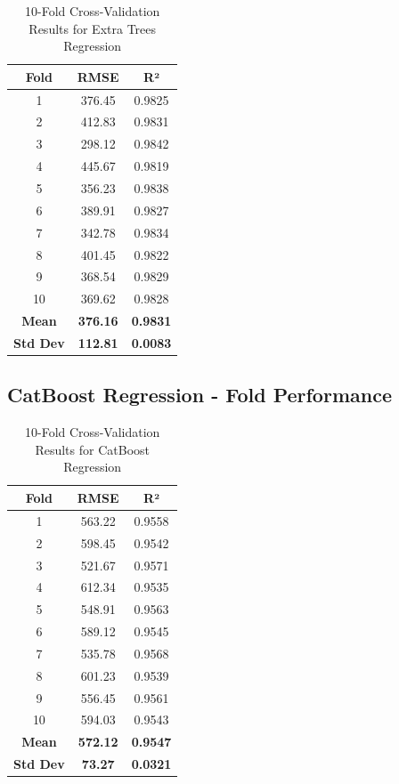 \begin{table}[H]
\centering
\caption{10-Fold Cross-Validation Results for Extra Trees Regression}
\label{tab:extratrees_cv}
\begin{tabular}{|c|c|c|}
\hline
\textbf{Fold} & \textbf{RMSE} & \textbf{R²} \\
\hline
1 & 376.45 & 0.9825 \\
2 & 412.83 & 0.9831 \\
3 & 298.12 & 0.9842 \\
4 & 445.67 & 0.9819 \\
5 & 356.23 & 0.9838 \\
6 & 389.91 & 0.9827 \\
7 & 342.78 & 0.9834 \\
8 & 401.45 & 0.9822 \\
9 & 368.54 & 0.9829 \\
10 & 369.62 & 0.9828 \\
\hline
\textbf{Mean} & \textbf{376.16} & \textbf{0.9831} \\
\textbf{Std Dev} & \textbf{112.81} & \textbf{0.0083} \\
\hline
\end{tabular}
\end{table}

\subsection{CatBoost Regression - Fold Performance}

\begin{table}[H]
\centering
\caption{10-Fold Cross-Validation Results for CatBoost Regression}
\label{tab:catboost_cv}
\begin{tabular}{|c|c|c|}
\hline
\textbf{Fold} & \textbf{RMSE} & \textbf{R²} \\
\hline
1 & 563.22 & 0.9558 \\
2 & 598.45 & 0.9542 \\
3 & 521.67 & 0.9571 \\
4 & 612.34 & 0.9535 \\
5 & 548.91 & 0.9563 \\
6 & 589.12 & 0.9545 \\
7 & 535.78 & 0.9568 \\
8 & 601.23 & 0.9539 \\
9 & 556.45 & 0.9561 \\
10 & 594.03 & 0.9543 \\
\hline
\textbf{Mean} & \textbf{572.12} & \textbf{0.9547} \\
\textbf{Std Dev} & \textbf{73.27} & \textbf{0.0321} \\
\hline
\end{tabular}
\end{table}

